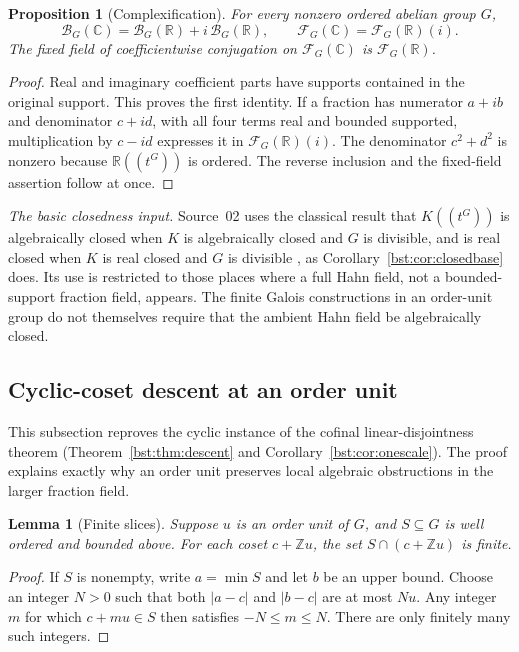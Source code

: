 \documentclass[11pt,letterpaper]{article}
\newtheorem{lemma}[theorem]{Lemma}
\newtheorem{proposition}[theorem]{Proposition}
\theoremstyle{definition}
\theoremstyle{remark}
\newcommand{\R}{\mathbb R}
\newcommand{\C}{\mathbb C}
\newcommand{\Z}{\mathbb Z}
\newcommand{\HH}[2]{#1((t^{#2}))}
\newcommand{\BB}[2]{\mathcal B_{#2}(#1)}
\newcommand{\FF}[2]{\mathcal F_{#2}(#1)}
\newcommand{\abs}[1]{\lvert #1\rvert}
\begin{document}
\begin{proposition}[Complexification]\label{bst:gr:prop:complexify}
For every nonzero ordered abelian group $G$,
\[
 \BB{\C}G=\BB{\R}G+i\,\BB{\R}G,\qquad \FF{\C}G=\FF{\R}G(i).
\]
The fixed field of coefficientwise conjugation on $\FF{\C}G$ is $\FF{\R}G$.
\end{proposition}
\begin{proof}
Real and imaginary coefficient parts have supports contained in the
original support. This proves the first identity. If a fraction has
numerator $a+ib$ and denominator $c+id$, with all four terms real and
bounded supported, multiplication by $c-id$ expresses it in $\FF{\R}G(i)$.
The denominator $c^2+d^2$ is nonzero because $\HH{\R}G$ is ordered. The
reverse inclusion and the fixed-field assertion follow at once.
\end{proof}

\emph{The basic closedness input.} Source~02 uses the classical result that
$K((t^G))$ is algebraically closed when $K$ is algebraically closed and $G$
is divisible, and is real closed when $K$ is real closed and $G$ is
divisible \cite[Fact~2.1.1]{LM24}, as Corollary~\ref{bst:cor:closedbase} does.
Its use is restricted to those places where a full Hahn field, not a
bounded-support fraction field, appears. The finite Galois constructions in
an order-unit group do not themselves require that the ambient Hahn field be
algebraically closed.

\subsection{Cyclic-coset descent at an order unit}

This subsection reproves the cyclic instance of the cofinal
linear-disjointness theorem (Theorem~\ref{bst:thm:descent} and
Corollary~\ref{bst:cor:onescale}). The proof explains exactly why an order
unit preserves local algebraic obstructions in the larger fraction field.

\begin{lemma}[Finite slices]\label{bst:gr:lem:slices}
Suppose $u$ is an order unit of $G$, and $S\subseteq G$ is well ordered and
bounded above. For each coset $c+\Z u$, the set $S\cap(c+\Z u)$ is finite.
\end{lemma}
\begin{proof}
If $S$ is nonempty, write $a=\min S$ and let $b$ be an upper bound.
Choose an integer $N>0$ such that both $\abs{a-c}$ and $\abs{b-c}$
are at most $Nu$. Any integer $m$ for which $c+mu\in S$ then satisfies
$-N\leq m\leq N$. There are only finitely many such integers.
\end{proof}
\end{document}
